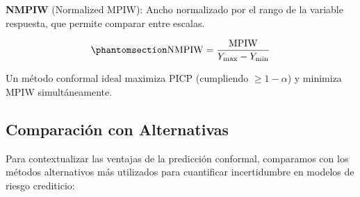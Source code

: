 \documentclass[
  spanish,
  11pt,
  letterpaper,
]{scrbook}
\theoremstyle{plain}
\theoremstyle{remark}
\begin{document}
\textbf{NMPIW} (Normalized MPIW): Ancho normalizado por el rango de la
variable respuesta, que permite comparar entre escalas.

\begin{equation}\protect\phantomsection\label{eq-nmpiw}{
\text{NMPIW} = \frac{\text{MPIW}}{Y_\text{max} - Y_\text{min}}
}\end{equation}

Un método conformal ideal maximiza PICP (cumpliendo \(\geq 1 - \alpha\))
y minimiza MPIW simultáneamente.

\subsection{Comparación con
Alternativas}\label{sec-alternatives-comparison}

Para contextualizar las ventajas de la predicción conformal, comparamos
con los métodos alternativos más utilizados para cuantificar
incertidumbre en modelos de riesgo crediticio:
\end{document}
